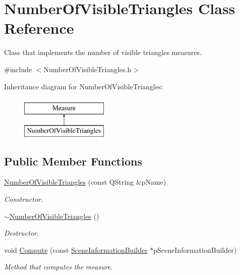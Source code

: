 \hypertarget{class_number_of_visible_triangles}{\section{Number\+Of\+Visible\+Triangles Class Reference}
\label{class_number_of_visible_triangles}
}


Class that implements the number of visible triangles measures.  




{\ttfamily \#include $<$Number\+Of\+Visible\+Triangles.\+h$>$}

Inheritance diagram for Number\+Of\+Visible\+Triangles\+:\begin{figure}[H]
\begin{center}
\leavevmode
\includegraphics[height=2.000000cm]{class_number_of_visible_triangles}
\end{center}
\end{figure}
\subsection*{Public Member Functions}
\begin{DoxyCompactItemize}
\item 
\hyperlink{class_number_of_visible_triangles_ae0df4cc0af58bc5badc8626d70c9e4c9}{Number\+Of\+Visible\+Triangles} (const Q\+String \&p\+Name)
\begin{DoxyCompactList}\small\item\em Constructor. \end{DoxyCompactList}\item 
\hyperlink{class_number_of_visible_triangles_a1f8c769b3af5816da23f69e230038174}{$\sim$\+Number\+Of\+Visible\+Triangles} ()
\begin{DoxyCompactList}\small\item\em Destructor. \end{DoxyCompactList}\item 
void \hyperlink{class_number_of_visible_triangles_a33c5130ab2090507e175b8bd017b66d3}{Compute} (const \hyperlink{class_scene_information_builder}{Scene\+Information\+Builder} $\ast$p\+Scene\+Information\+Builder)
\begin{DoxyCompactList}\small\item\em Method that computes the measure. \end{DoxyCompactList}\end{DoxyCompactItemize}
